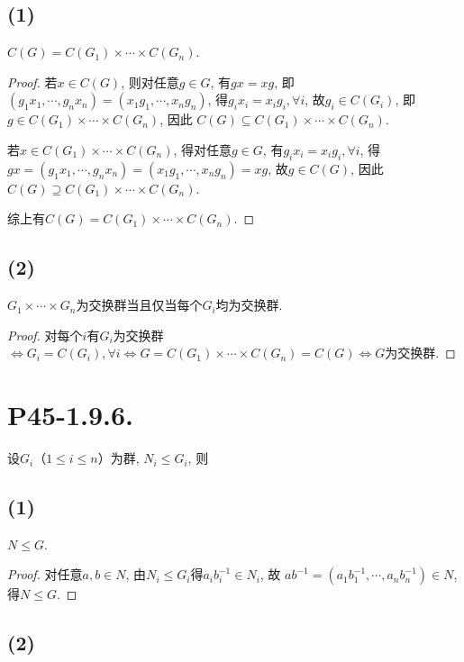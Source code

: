 \documentclass[12pt, a4paper, fontset=windows]{ctexart}
\newcommand{\kh}[1]{（{#1}）} %
\newcommand{\timess}{\times\cdots\times}
\begin{document}
\subsection*{(1)}

$C(G)=C(G_1)\timess C(G_n)$. 

\begin{proof}
若$x\in C(G)$, 则对任意$g\in G$, 
有$gx=xg$, 即$(g_1x_1,\cdots,g_nx_n)=(x_1g_1,\cdots,x_ng_n)$, 
得$g_ix_i=x_ig_i,\forall i$, 故$g_i\in C(G_i)$, 即
$g\in C(G_1)\timess C(G_n)$, 因此
$C(G)\subseteq C(G_1)\timess C(G_n)$. 

若$x\in C(G_1)\timess C(G_n)$, 得对任意$g\in G$, 
有$g_ix_i=x_ig_i,\forall i$, 得$gx=(g_1x_1,\cdots,g_nx_n)
=(x_1g_1,\cdots,x_ng_n)=xg$, 故$g\in C(G)$, 
因此$C(G)\supseteq C(G_1)\timess C(G_n)$. 

综上有$C(G)=C(G_1)\timess C(G_n)$. 
\end{proof}

\subsection*{(2)}

$G_1\timess G_n$为交换群当且仅当每个$G_i$均为交换群. 

\begin{proof}
对每个$i$有$G_i$为交换群$\iff G_i=C(G_i),\forall i\iff 
G=C(G_1)\timess C(G_n)=C(G)\iff G$为交换群. 
\end{proof}

\section*{P45-1.9.6.}

设$G_i$\kh{$1\le i\le n$}为群, $N_i\le G_i$, 则

\subsection*{(1)}

$N\le G$. 

\begin{proof}
对任意$a,b\in N$, 由$N_i\le G_i$得$a_ib_i^{-1}\in N_i$, 故
$ab^{-1}=(a_1b_1^{-1},\cdots,a_nb_n^{-1})\in N$, 得$N\le G$. 
\end{proof}

\subsection*{(2)}
\end{document}
